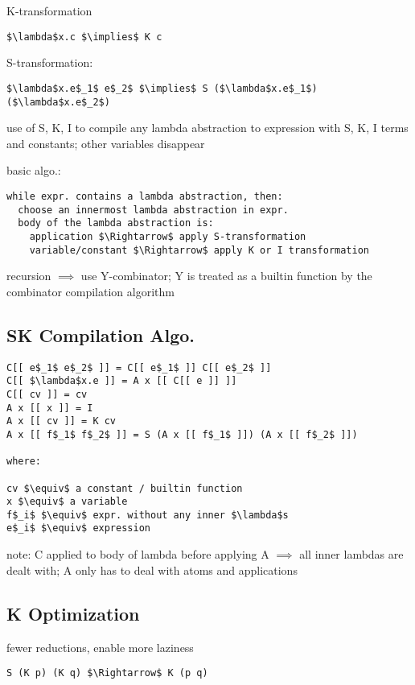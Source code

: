 \documentclass[8pt]{extarticle}
\begin{document}
\begin{multicols*}{2}
K-transformation
\begin{lstlisting}
$\lambda$x.c $\implies$ K c
\end{lstlisting}

S-transformation:
\begin{lstlisting}
$\lambda$x.e$_1$ e$_2$ $\implies$ S ($\lambda$x.e$_1$)($\lambda$x.e$_2$)
\end{lstlisting}

use of S, K, I to compile any lambda abstraction to expression with S, K, I terms and constants; other variables disappear

basic algo.:
\begin{lstlisting}
while expr. contains a lambda abstraction, then:
  choose an innermost lambda abstraction in expr.
  body of the lambda abstraction is:
    application $\Rightarrow$ apply S-transformation
    variable/constant $\Rightarrow$ apply K or I transformation
\end{lstlisting}

recursion $\implies$ use Y-combinator; Y is treated as a builtin function by the combinator compilation algorithm

\subsection{SK Compilation Algo.}
\begin{lstlisting}
C[[ e$_1$ e$_2$ ]] = C[[ e$_1$ ]] C[[ e$_2$ ]]
C[[ $\lambda$x.e ]] = A x [[ C[[ e ]] ]]
C[[ cv ]] = cv
A x [[ x ]] = I
A x [[ cv ]] = K cv
A x [[ f$_1$ f$_2$ ]] = S (A x [[ f$_1$ ]]) (A x [[ f$_2$ ]])

where:

cv $\equiv$ a constant / builtin function
x $\equiv$ a variable
f$_i$ $\equiv$ expr. without any inner $\lambda$s
e$_i$ $\equiv$ expression
\end{lstlisting}

note: C applied to body of lambda before applying A $\implies$ all inner lambdas are dealt with; A only has to deal with atoms and applications

\subsection{K Optimization}

fewer reductions, enable more laziness

\begin{lstlisting}
S (K p) (K q) $\Rightarrow$ K (p q)
\end{lstlisting}


\end{multicols*}
\end{document}
